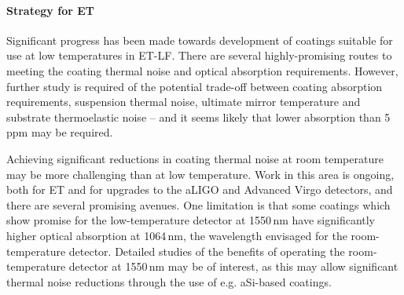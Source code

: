 \paragraph{Strategy for ET}

Significant progress has been made towards development of coatings suitable for use at low temperatures in ET-LF. There are several highly-promising routes to meeting the coating thermal noise and optical absorption requirements. However, further study is required of the potential trade-off between coating absorption requirements, suspension thermal noise, ultimate mirror temperature and substrate thermoelastic noise -- and it seems likely that lower absorption than 5\,ppm may be required.

Achieving significant reductions in coating thermal noise at room temperature may be more challenging than at low temperature. Work in this area is ongoing, both for ET and for upgrades to the aLIGO and Advanced Virgo detectors, and there are several promising avenues. One limitation is that some coatings which show promise for the low-temperature detector at 1550\,nm have significantly higher optical absorption at 1064\,nm, the wavelength envisaged for the room-temperature detector. Detailed studies of the benefits of operating the room-temperature detector at 1550\,nm may be of interest, as this may allow significant thermal noise reductions through the use of e.g. aSi-based coatings.




